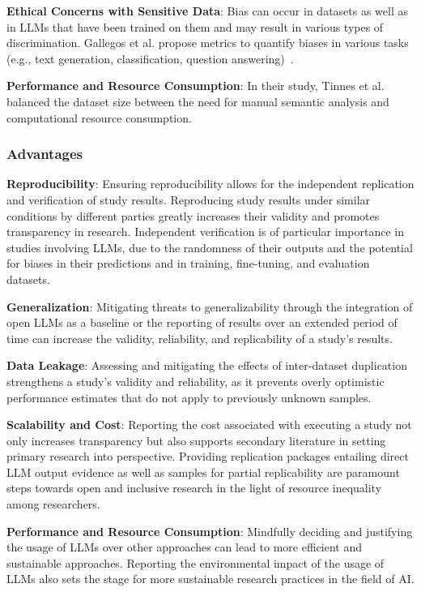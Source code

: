 \textbf{Ethical Concerns with Sensitive Data}:
Bias can occur in datasets as well as in LLMs that have been trained on them and may result in various types of discrimination. Gallegos et al. propose metrics to quantify biases in various tasks (e.g., text generation, classification, question answering)~\cite{DBLP:journals/corr/abs-2309-00770}.

\textbf{Performance and Resource Consumption}:
In their study, Tinnes et al.~\cite{tinnessoftware} balanced the dataset size between the need for manual semantic analysis and computational resource consumption.

\subsubsection{Advantages}
\textbf{Reproducibility}:
Ensuring reproducibility allows for the independent replication and verification of study results.
Reproducing study results under similar conditions by different parties greatly increases their validity and promotes transparency in research.
Independent verification is of particular importance in studies involving LLMs, due to the randomness of their outputs and the potential for biases in their predictions and in training, fine-tuning, and evaluation datasets.

\textbf{Generalization}:
Mitigating threats to generalizability through the integration of open LLMs as a baseline or the reporting of results over an extended period of time can increase the validity, reliability, and replicability of a study's results.

\textbf{Data Leakage}:
Assessing and mitigating the effects of inter-dataset duplication strengthens a study's validity and reliability, as it prevents overly optimistic performance estimates that do not apply to previously unknown samples.

\textbf{Scalability and Cost}:
Reporting the cost associated with executing a study not only increases transparency but also supports secondary literature in setting primary research into perspective.
Providing replication packages entailing direct LLM output evidence as well as samples for partial replicability are paramount steps towards open and inclusive research in the light of resource inequality among researchers.

\textbf{Performance and Resource Consumption}:
Mindfully deciding and justifying the usage of LLMs over other approaches can lead to more efficient and sustainable approaches. 
Reporting the environmental impact of the usage of LLMs also sets the stage for more sustainable research practices in the field of AI.

